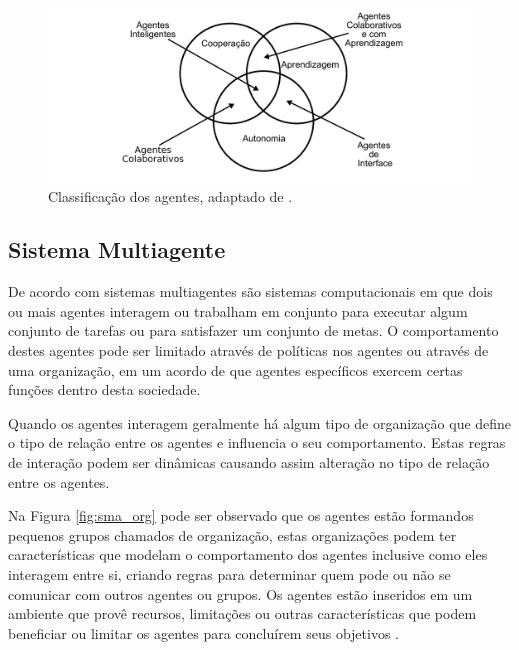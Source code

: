 \begin{figure}[ht]
\centering
\includegraphics[scale=0.7]{imagens/tipos_agentes.pdf}
\caption{Classificação dos agentes, adaptado de \cite{nwana1996software}.}
\label{fig:class_agente}
\end{figure}





\subsection{Sistema Multiagente}

De acordo com \cite{lesser1999cooperative} sistemas multiagentes são sistemas computacionais em que dois ou mais agentes interagem ou trabalham em conjunto para executar algum conjunto de tarefas ou para satisfazer um conjunto de metas. O comportamento destes agentes pode ser limitado através de políticas nos agentes ou através de uma organização, em um acordo de que agentes específicos exercem certas funções dentro desta sociedade.

Quando os agentes interagem geralmente há algum tipo de organização que define o tipo de relação entre os agentes e influencia o seu comportamento. Estas regras de interação podem ser dinâmicas causando assim alteração no tipo de relação entre os agentes. 

Na Figura \ref{fig:sma_org} pode ser observado que os agentes estão formandos pequenos grupos chamados de organização, estas organizações podem ter características que modelam o comportamento dos agentes inclusive como eles interagem entre si, criando regras para determinar quem pode ou não se comunicar com outros agentes ou grupos. Os agentes estão inseridos em um ambiente que provê recursos, limitações ou outras características que podem beneficiar ou limitar os agentes para concluírem seus objetivos  \cite{jennings2000agent}. 

